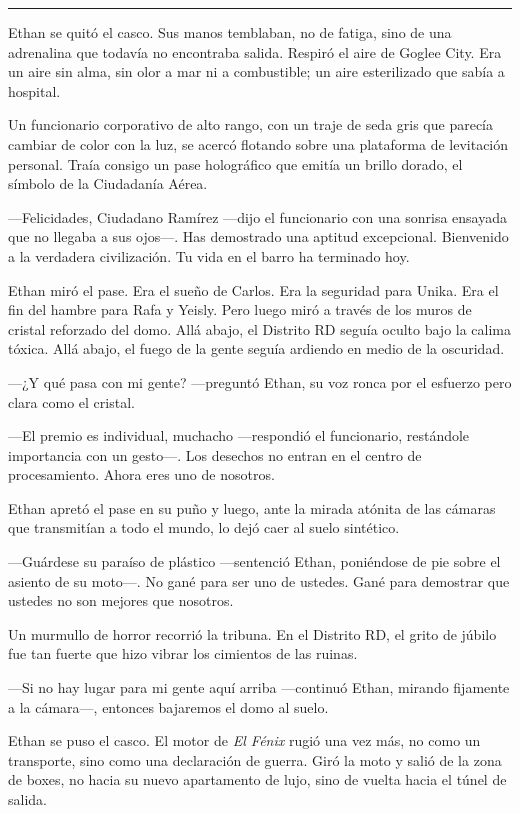 \documentclass[12pt,a4paper]{book}
\begin{document}
\bigskip
\noindent\rule{\textwidth}{0.4pt}
\bigskip

Ethan se quitó el casco. Sus manos temblaban, no de fatiga, sino de una adrenalina que todavía no encontraba salida. Respiró el aire de Goglee City. Era un aire sin alma, sin olor a mar ni a combustible; un aire esterilizado que sabía a hospital.

Un funcionario corporativo de alto rango, con un traje de seda gris que parecía cambiar de color con la luz, se acercó flotando sobre una plataforma de levitación personal. Traía consigo un pase holográfico que emitía un brillo dorado, el símbolo de la Ciudadanía Aérea.

---Felicidades, Ciudadano Ramírez ---dijo el funcionario con una sonrisa ensayada que no llegaba a sus ojos---. Has demostrado una aptitud excepcional. Bienvenido a la verdadera civilización. Tu vida en el barro ha terminado hoy.

Ethan miró el pase. Era el sueño de Carlos. Era la seguridad para Unika. Era el fin del hambre para Rafa y Yeisly. Pero luego miró a través de los muros de cristal reforzado del domo. Allá abajo, el Distrito RD seguía oculto bajo la calima tóxica. Allá abajo, el fuego de la gente seguía ardiendo en medio de la oscuridad.

---¿Y qué pasa con mi gente? ---preguntó Ethan, su voz ronca por el esfuerzo pero clara como el cristal.

---El premio es individual, muchacho ---respondió el funcionario, restándole importancia con un gesto---. Los desechos no entran en el centro de procesamiento. Ahora eres uno de nosotros.

Ethan apretó el pase en su puño y luego, ante la mirada atónita de las cámaras que transmitían a todo el mundo, lo dejó caer al suelo sintético.

---Guárdese su paraíso de plástico ---sentenció Ethan, poniéndose de pie sobre el asiento de su moto---. No gané para ser uno de ustedes. Gané para demostrar que ustedes no son mejores que nosotros.

Un murmullo de horror recorrió la tribuna. En el Distrito RD, el grito de júbilo fue tan fuerte que hizo vibrar los cimientos de las ruinas.

---Si no hay lugar para mi gente aquí arriba ---continuó Ethan, mirando fijamente a la cámara---, entonces bajaremos el domo al suelo.

Ethan se puso el casco. El motor de \textit{El Fénix} rugió una vez más, no como un transporte, sino como una declaración de guerra. Giró la moto y salió de la zona de boxes, no hacia su nuevo apartamento de lujo, sino de vuelta hacia el túnel de salida.
\end{document}
